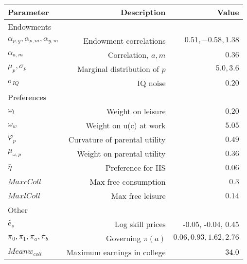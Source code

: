 \begin{tabular}{lrr}
\hline
Parameter & Description  & Value  \\
\hline
Endowments &   &   \\
$\alpha_{p,y}, \alpha_{p,m}, \alpha_{y,m}$ & Endowment correlations  & $0.51, -0.58, 1.38$  \\
$\alpha_{a,m}$ & Correlation, $a,m$  & $0.36$  \\
$\mu_{p}, \sigma_{p}$ & Marginal distribution of $p$  & $5.0, 3.6$  \\
$\sigma_{IQ}$ & IQ noise  & $0.20$  \\
Preferences &   &   \\
$\omega_{l}$ & Weight on leisure  & $0.20$  \\
$\omega_{w}$ & Weight on u(c) at work  & $5.05$  \\
$\varphi_{p}$ & Curvature of parental utility  & $0.49$  \\
$\mu_{\omega,p}$ & Weight on parental utility  & $0.36$  \\
$\bar{\eta}$ & Preference for HS  & $0.06$  \\
$Max cColl$ & Max free consumption  & $0.3$  \\
$Max lColl$ & Max free leisure  & $0.14$  \\
Other &   &   \\
$\hat{e}_{s}$ & Log skill prices  & -0.05, -0.04, 0.45  \\
$\pi_{0}, \pi_{1}, \pi_{a}, \pi_{b}$ & Governing $\pi(a)$  & $0.06, 0.93, 1.62, 2.76$  \\
$Mean w_{coll}$ & Maximum earnings in college  & $34.0$  \\
\hline
\end{tabular}%

